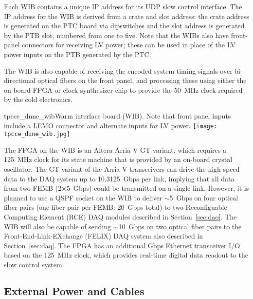 
Each WIB contains a 
unique IP address for its UDP slow control interface. The IP address for the WIB is 
derived from a crate and slot address: the crate address is generated on the PTC 
board via dipswitches and the slot address is generated by the PTB slot, numbered 
from one to five. Note that the WIBs also have front-panel
connectors for receiving LV power; these can be used in place of 
the LV power inputs on the PTB generated by the PTC.

The WIB is also capable of
receiving the encoded system timing signals over bi-directional optical
fibers on the front panel, and processing these using either
the on-board FPGA or clock synthesizer chip to provide the 50~MHz
clock required by the cold electronics.  

\begin{cdrfigure}{tpcce_dune_wib}{Warm interface board (WIB). Note 
that front panel inputs include a LEMO connector and alternate inputs for LV power.}
\texttt{[image: tpcce\_dune\_wib.jpg]}
\end{cdrfigure}

The FPGA on the WIB is an Altera Arria V GT variant, which requires a
125~MHz clock for its state machine that is provided by an on-board crystal
oscillator. The GT variant of the Arria V
transceivers can drive the high-speed data to the DAQ system up to
10.3125~Gbps per link,  implying that all data from
two FEMB (2$\times$5~Gbps) could be transmitted on a single link. However, it is planned to
use a QSPF socket on the WIB to deliver $\sim$5~Gbps on four optical fiber pairs 
(one fiber pair per FEMB: 20~Gbps total) to two Reconfiguable Computing Element (RCE) DAQ modules 
described in Section~\ref{sec:daq}. The WIB will also be capable of sending $\sim$10~Gbps on 
two optical fiber pairs to the Front-End-Link-EXchange (FELIX) DAQ system also described in Section~\ref{sec:daq}.
The FPGA has an additional Gbps Ethernet transceiver I/O based on the 125~MHz clock, which 
provides real-time digital data readout to the slow control system.



%
\subsection{External Power and Cables}
\label{subsec:ce_feedthrough_power}


